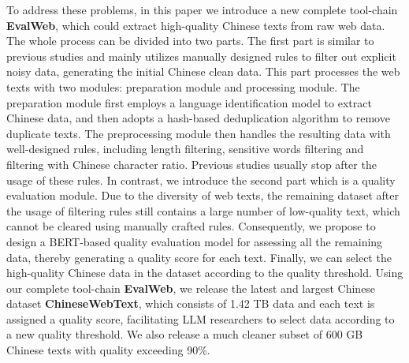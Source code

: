 \documentclass{article}
\begin{document}

To address these problems, in this paper we introduce a new complete tool-chain \textbf{EvalWeb}, which could extract high-quality Chinese texts from raw web data. The whole process can be divided into two parts. The first part is similar to previous studies and mainly utilizes manually designed rules to filter out explicit noisy data, generating the initial Chinese clean data. This part processes the web texts with two modules: preparation module and processing module. The preparation module first employs a language identification model to extract Chinese data, and then adopts a hash-based deduplication algorithm to remove duplicate texts. The preprocessing module then handles the resulting data with well-designed rules, including length filtering, sensitive words filtering and filtering with Chinese character ratio. Previous studies usually stop after the usage of these rules. In contrast, we introduce the second part which is a quality evaluation module. Due to the diversity of web texts, the remaining dataset after the usage of filtering rules still contains a large number of low-quality text, which cannot be cleared using manually crafted rules. Consequently, we propose to design a BERT-based quality evaluation model for assessing all the remaining data, thereby generating a quality score for each text. Finally, we can select the high-quality Chinese data in the dataset according to the quality threshold. Using our complete tool-chain \textbf{EvalWeb}, we release the latest and largest Chinese dataset \textbf{ChineseWebText}, which consists of 1.42 TB data and each text is assigned a quality score, facilitating LLM researchers to select data according to a new quality threshold. We also release a much cleaner subset of 600 GB Chinese texts with quality exceeding 90\%.
\end{document}
